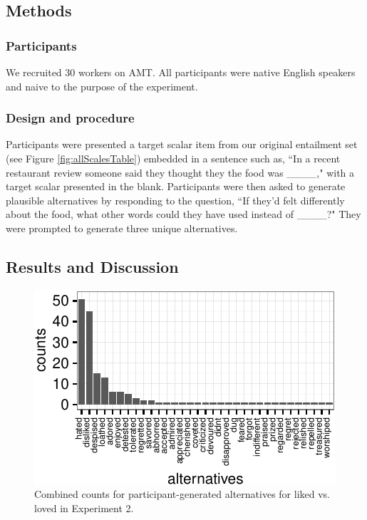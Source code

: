 \documentclass[10pt, letterpaper]{article}
\newenvironment{CodeChunk}{}{}
\begin{document}
\subsection{Methods}\label{methods-1}

\subsubsection{Participants}\label{participants-1}

We recruited 30 workers on AMT. All participants were native English
speakers and naive to the purpose of the experiment.

\subsubsection{Design and procedure}\label{design-and-procedure-1}

Participants were presented a target scalar item from our original
entailment set (see Figure \ref{fig:allScalesTable}) embedded in a
sentence such as, ``In a recent restaurant review someone said they
thought they the food was \_\_\_\_," with a target scalar presented in
the blank. Participants were then asked to generate plausible
alternatives by responding to the question, ``If they'd felt differently
about the food, what other words could they have used instead of
\_\_\_\_?" They were prompted to generate three unique alternatives.

\subsection{Results and Discussion}\label{results-and-discussion-1}

\begin{CodeChunk}
\begin{figure}[t]

{\centering \includegraphics{figs/exp2_altsPlot_likedLoved-1} 

}

\caption[Combined counts for participant-generated alternatives for liked vs]{Combined counts for participant-generated alternatives for liked vs. loved in Experiment 2.}\label{fig:exp2_altsPlot_likedLoved}
\end{figure}
\end{CodeChunk}
\end{document}
